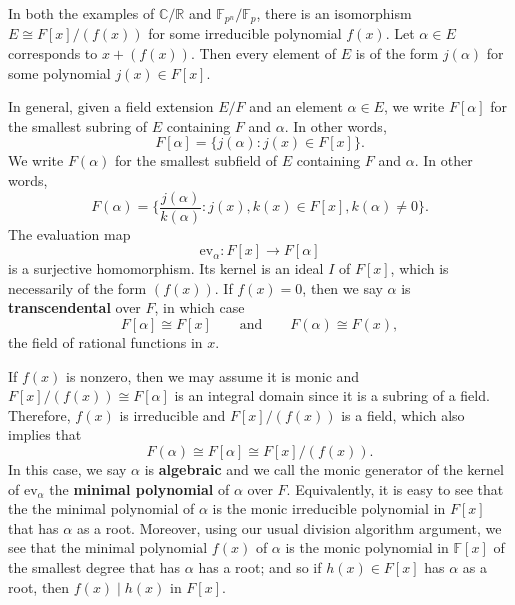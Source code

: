 \documentclass{article}
\def\R{{\mathbb R}}
\def\F{{\mathbb F}}
\def\F{{\mathbb F}}
\def\C{{\mathbb C}}
\newtheorem{lemma}[subsection]{Lemma}
\newenvironment{proof}{\noindent {\bf Proof:}}{$\Box$ \vspace{2 ex}}
\begin{document}
In both the examples of $\C/\R$ and $\F_{p^n}/\F_p$, there is an isomorphism $E\cong F[x]/(f(x))$ for some irreducible polynomial $f(x)$. Let $\alpha\in E$ corresponds to $x + (f(x))$. Then every element of $E$ is of the form $j(\alpha)$ for some polynomial $j(x)\in F[x]$.

In general, given a field extension $E/F$ and an element $\alpha\in E$, we write $F[\alpha]$ for the smallest subring of $E$ containing $F$ and $\alpha$. In other words,
$$F[\alpha] = \{j(\alpha)\colon j(x)\in F[x]\}.$$
We write $F(\alpha)$ for the smallest subfield of $E$ containing $F$ and $\alpha$. In other words,
$$F(\alpha) = \Big\{\frac{j(\alpha)}{k(\alpha)}\colon j(x),k(x)\in F[x],k(\alpha)\neq 0\Big\}.$$
The evaluation map $$\text{ev}_\alpha:F[x]\rightarrow F[\alpha]$$ is a surjective homomorphism. Its kernel is an ideal $I$ of $F[x]$, which is necessarily of the form $(f(x))$. If $f(x) = 0$, then we say $\alpha$ is \textbf{transcendental} over $F$, in which case $$F[\alpha]\cong F[x]\qquad\mbox{and}\qquad F(\alpha)\cong F(x),$$ the field of rational functions in $x$. 

If $f(x)$ is nonzero, then we may assume it is monic and $F[x]/(f(x))\cong F[\alpha]$ is an integral domain since it is a subring of a field. Therefore, $f(x)$ is irreducible and $F[x]/(f(x))$ is a field, which also implies that $$F(\alpha) \cong F[\alpha] \cong F[x]/(f(x)).$$ In this case, we say $\alpha$ is \textbf{algebraic} and we call the monic generator of the kernel of $\text{ev}_\alpha$ the \textbf{minimal polynomial} of $\alpha$ over $F$. Equivalently, it is easy to see that the the minimal polynomial of $\alpha$ is the monic irreducible polynomial in $F[x]$ that has $\alpha$ as a root. Moreover, using our usual division algorithm argument, we see that the minimal polynomial $f(x)$ of $\alpha$ is the monic polynomial in $\F[x]$ of the smallest degree that has $\alpha$ has a root; and so if $h(x)\in F[x]$ has $\alpha$ as a root, then $f(x)\mid h(x)$ in $F[x]$. 

\begin{comment}
    \begin{lemma}
    If $f(x)\in F[x]$ is a monic irreducible polynomial and $\alpha$ is a root of $f(x)$, then $f(x)$ is the minimal polynomial of $\alpha$.
\end{lemma}

\begin{proof}
    The minimal polynomial $g(x)$ of $\alpha$ is a monic irreducible polynomial dividing $f(x)$. Since they are both irreducible, we have $g(x) = f(x)u$ for some $u\in F^\times$. Since they are both monic, we have $u = 1$.
\end{proof}
\end{comment}
\end{document}
